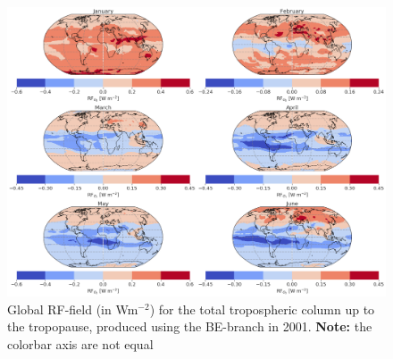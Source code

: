 
\begin{figure}[ht]
    \centering
    \includegraphics[width = \linewidth]{Chapter6_Results/images/RF/BE_RF_global_2001.png}
    \caption{Global RF-field (in Wm$^{-2}$) for the total tropospheric column up to the tropopause, produced using the BE-branch in 2001. \textbf{Note:} the colorbar axis are not equal}
    \label{fig:BE_RF_global_2001}
\end{figure}
